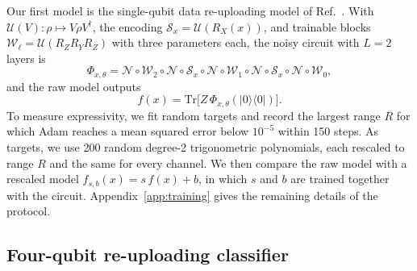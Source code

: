 \documentclass[
 aps,pra,
 twocolumn,
 superscriptaddress,
 longbibliography,
 nofootinbib
]{revtex4-2}
\newcommand{\Tr}{\mathrm{Tr}}
\providecommand{\ket}[1]{\lvert #1 \rangle}
\providecommand{\bra}[1]{\langle #1 \rvert}
\begin{document}
Our first model is the single-qubit data re-uploading model of
Ref.~\cite{vanrossum2026biased}. With $\mathcal U(V)\colon\rho\mapsto V\rho
V^\dagger$, the encoding $\mathcal S_x=\mathcal U(R_X(x))$, and trainable
blocks $\mathcal W_\ell=\mathcal U(R_ZR_YR_Z)$ with three parameters each, the
noisy circuit with $L=2$ layers is
\begin{equation}
\Phi_{x,\theta}=\mathcal N\circ\mathcal W_2\circ\mathcal N\circ\mathcal S_x
\circ\mathcal N\circ\mathcal W_1\circ\mathcal N\circ\mathcal S_x\circ\mathcal N
\circ\mathcal W_0 ,
\label{eq:vr_map}
\end{equation}
and the raw model outputs
\begin{equation}
f(x)=\Tr\bigl[Z\,\Phi_{x,\theta}(\ket0\bra0)\bigr].
\label{eq:vr_raw}
\end{equation}
To measure expressivity, we fit random targets and record the largest range
$R$ for which Adam reaches a mean squared error below $10^{-5}$ within 150
steps. As targets, we use 200 random degree-2 trigonometric polynomials, each
rescaled to range $R$ and the same for every channel. We then compare the raw
model with a rescaled model $f_{s,b}(x)=s\,f(x)+b$, in which $s$ and $b$ are
trained together with the circuit. Appendix~\ref{app:training} gives the remaining
details of the protocol.

\subsection{Four-qubit re-uploading classifier}
\label{sec:model_clf}
\end{document}
